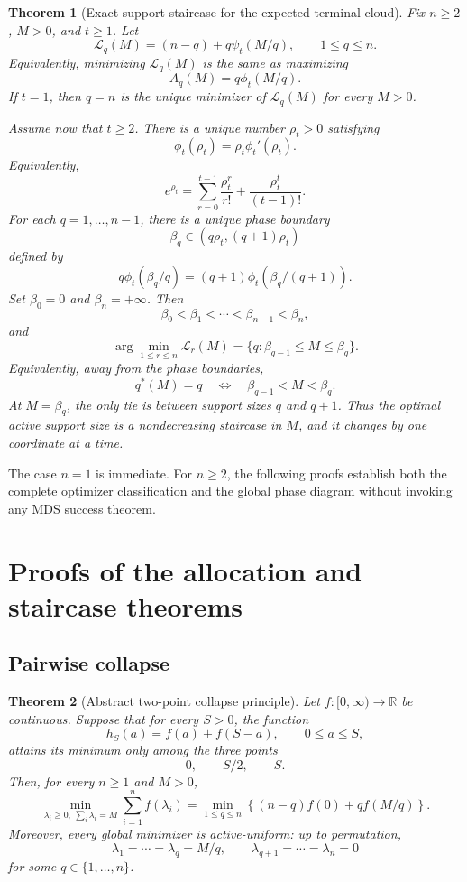 \documentclass[11pt]{article}
\newtheorem{theorem}{Theorem}[section]
\theoremstyle{definition}
\theoremstyle{remark}
\newcommand{\1}{\mathbf 1}
\begin{document}
\begin{theorem}[Exact support staircase for the expected terminal cloud]
\label{thm:terminal-cloud-staircase}
Fix \(n\ge2\), \(M>0\), and \(t\ge1\).  Let
\[
  \mathcal L_q(M)=(n-q)+q\psi_t(M/q),
  \qquad 1\le q\le n.
\]
Equivalently, minimizing \(\mathcal L_q(M)\) is the same as maximizing
\[
  A_q(M)=q\phi_t(M/q).
\]
If \(t=1\), then \(q=n\) is the unique minimizer of \(\mathcal L_q(M)\) for every \(M>0\).

Assume now that \(t\ge2\).  There is a unique number \(\rho_t>0\) satisfying
\[
  \phi_t(\rho_t)=\rho_t\phi_t'(\rho_t).
\]
Equivalently,
\[
  e^{\rho_t}
  =
  \sum_{r=0}^{t-1}\frac{\rho_t^r}{r!}
  +\frac{\rho_t^t}{(t-1)!}.
\]
For each \(q=1,\ldots,n-1\), there is a unique phase boundary
\[
  \beta_q\in(q\rho_t,(q+1)\rho_t)
\]
defined by
\[
  q\phi_t(\beta_q/q)
  =(q+1)\phi_t(\beta_q/(q+1)).
\]
Set \(\beta_0=0\) and \(\beta_n=+\infty\).  Then
\[
  \beta_0<\beta_1<\cdots<\beta_{n-1}<\beta_n,
\]
and
\[
  \arg\min_{1\le r\le n}\mathcal L_r(M)
  =
  \{q:\beta_{q-1}\le M\le\beta_q\}.
\]
Equivalently, away from the phase boundaries,
\[
  q^*(M)=q
  \quad\Longleftrightarrow\quad
  \beta_{q-1}<M<\beta_q.
\]
At \(M=\beta_q\), the only tie is between support sizes \(q\) and \(q+1\).  Thus the optimal active support size is a nondecreasing staircase in \(M\), and it changes by one coordinate at a time.
\end{theorem}
The case \(n=1\) is immediate. For \(n\ge2\), the following proofs
establish both the complete optimizer classification and the global
phase diagram without invoking any MDS success theorem.

\section{Proofs of the allocation and staircase theorems}
\label{sec:cloud-proofs}
\subsection{Pairwise collapse}
\begin{theorem}[Abstract two-point collapse principle]
\label{thm:abstract-two-point-collapse}
Let $f:[0,\infty)\to\mathbb R$ be continuous.  Suppose that for every $S>0$, the function
\[
  h_S(a)=f(a)+f(S-a),\qquad 0\le a\le S,
\]
attains its minimum only among the three points
\[
  0,\qquad S/2,\qquad S.
\]
Then, for every $n\ge1$ and $M>0$,
\[
  \min_{\lambda_i\ge0,\ \sum_i\lambda_i=M}\sum_{i=1}^n f(\lambda_i)
  =\min_{1\le q\le n}\left\{(n-q)f(0)+qf(M/q)\right\}.
\]
Moreover, every global minimizer is active-uniform: up to permutation,
\[
  \lambda_1=\cdots=\lambda_q=M/q,
  \qquad
  \lambda_{q+1}=\cdots=\lambda_n=0
\]
for some $q\in\{1,\ldots,n\}$.
\end{theorem}
\end{document}
